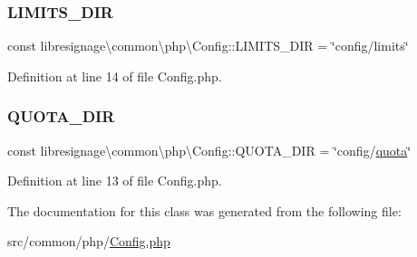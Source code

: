 \subsubsection{\texorpdfstring{L\+I\+M\+I\+T\+S\+\_\+\+D\+IR}{LIMITS\_DIR}}
{\footnotesize\ttfamily const libresignage\textbackslash{}common\textbackslash{}php\textbackslash{}\+Config\+::\+L\+I\+M\+I\+T\+S\+\_\+\+D\+IR = \char`\"{}config/limits\char`\"{}}



Definition at line 14 of file Config.\+php.

\mbox{\label{classlibresignage_1_1common_1_1php_1_1Config_a8345a7684928e0bd0676f5ad697e43dd}} 
\subsubsection{\texorpdfstring{Q\+U\+O\+T\+A\+\_\+\+D\+IR}{QUOTA\_DIR}}
{\footnotesize\ttfamily const libresignage\textbackslash{}common\textbackslash{}php\textbackslash{}\+Config\+::\+Q\+U\+O\+T\+A\+\_\+\+D\+IR = \char`\"{}config/\hyperlink{classlibresignage_1_1common_1_1php_1_1Config_a59324fe7bd91e189c54c8a925df9359a}{quota}\char`\"{}}



Definition at line 13 of file Config.\+php.



The documentation for this class was generated from the following file\+:\begin{DoxyCompactItemize}
\item 
src/common/php/\hyperlink{Config_8php}{Config.\+php}\end{DoxyCompactItemize}
